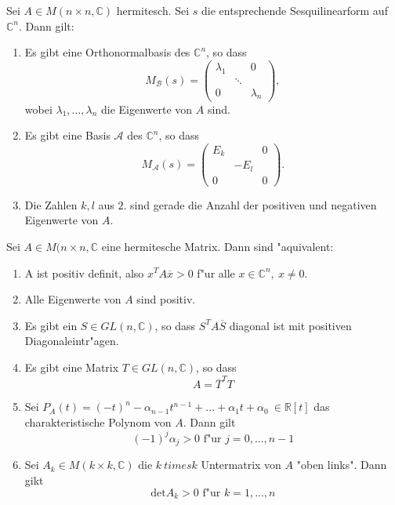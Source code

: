 \documentclass[11pt, a4paper]{article}
\begin{document}

\begin{theorem}
Sei $A \in M (n \times n, \mathbb{C} )$ hermitesch. Sei $s$ die entsprechende Sesquilinearform auf $\mathbb{C}^n$. Dann gilt:
\begin{enumerate}
\item Es gibt eine Orthonormalbasis des $\mathbb{C}^n$, so dass 
$$
M_\mathcal{B}(s) = \left(\begin{array}{ccc}\lambda_{1} & & 0 
\\ & \ddots & 
\\ 0 & & \lambda_{n}\end{array}\right), 
$$
wobei $\lambda_1, ..., \lambda_n$ die Eigenwerte von $A$ sind.
\item Es gibt eine Basis $\mathcal{A}$ des $\mathbb{C}^n$, so dass
$$
M_\mathcal{A}(s) =  \left(\begin{array}{ccc}E_k & & 0 
\\ & -E_l & 
\\ 0 & & 0\end{array}\right). 
$$
\item Die Zahlen $k, l$ aus $2.$ sind gerade die Anzahl der positiven und negativen Eigenwerte von $A$. 
\end{enumerate}
\end{theorem}

\begin{theorem}
Sei $A \in M (n \times n, \mathbb{C}$ eine hermitesche Matrix. Dann sind "aquivalent:
\begin{enumerate}
\item A ist positiv definit, also $x^TA\overline{x} > 0$ f"ur alle $x \in \mathbb{C}^n, \ x \neq 0$.
\item Alle Eigenwerte von $A$ sind positiv.
\item Es gibt ein $S \in GL(n, \mathbb{C})$, so dass $S^TA\overline{S}$ diagonal ist mit positiven Diagonaleintr"agen.
\item Es gibt eine Matrix $T \in GL(n, \mathbb{C})$, so dass
$$
A = \overline{T}^T T
$$
\item Sei $P_A(t) = (-t)^n - \alpha_{n-1}t^{n-1} + ... + \alpha_1 t + \alpha_0 \ \in \mathbb{R} [t]$ das charakteristische Polynom von $A$. Dann gilt 
$$
(-1)^j\alpha_j > 0 \text{ f"ur } j = 0, ..., n-1
$$
\item Sei $A_k  \in M(k \times k, \mathbb{C})$ die $k \ times k$ Untermatrix von $A$ "oben links". Dann gikt
$$
\mathrm{det}A_k > 0 \text{ f"ur  } k = 1, ..., n
$$
\end{enumerate}
\end{theorem}
\end{document}
